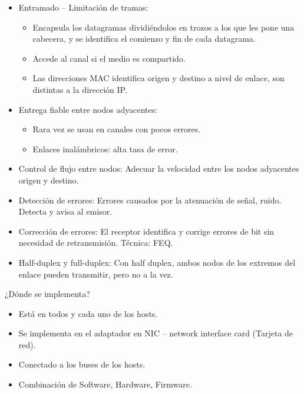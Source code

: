 \documentclass[12pt, twoside, openright]{report} %
\begin{document}
\begin{itemize}
	\item Entramado -- Limitación de tramas:

	      \begin{itemize}
		      \item Encapsula los datagramas dividiéndolos en trozos a los que les
		            pone una cabecera, y se identifica el comienzo y fin de cada
		            datagrama.
		      \item Accede al canal si el medio es compartido.
		      \item Las direcciones MAC identifica origen y destino a nivel de
		            enlace, son distintas a la dirección IP.
	      \end{itemize}
	\item Entrega fiable entre nodos adyacentes:

	      \begin{itemize}
		      \item Rara vez se usan en canales con pocos errores.
		      \item Enlaces inalámbricos: alta tasa de error.
	      \end{itemize}
	\item Control de flujo entre nodos: Adecuar la velocidad entre los nodos
	      adyacentes origen y destino.
	\item Detección de errores: Errores causados por la atenuación de señal,
	      ruido. Detecta y avisa al emisor.
	\item Corrección de errores: El receptor identifica y corrige errores de
	      bit sin necesidad de retransmisión. Técnica: FEQ.
	\item Half-duplex y full-duplex: Con half duplex, ambos nodos de los
	      extremos del enlace pueden transmitir, pero no a la vez.
\end{itemize}

¿Dónde se implementa?

\begin{itemize}
	\item Está en todos y cada uno de los hosts.
	\item Se implementa en el adaptador en NIC -- network interface card
	      (Tarjeta de red).
	\item Conectado a los buses de los hosts.
	\item Combinación de Software, Hardware, Firmware.

\end{itemize}
\end{document}
